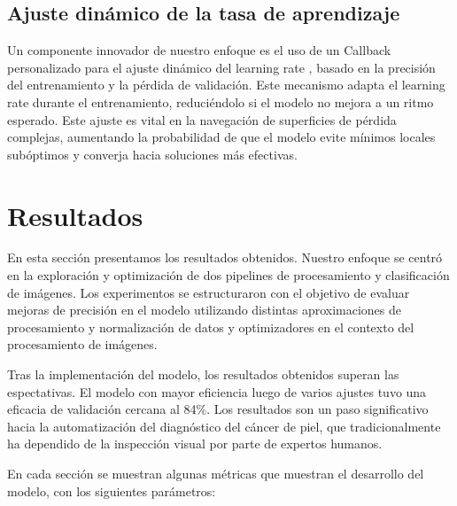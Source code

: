 \subsection{Ajuste dinámico de la tasa de aprendizaje}

Un componente innovador de nuestro enfoque es el uso de un Callback personalizado para el ajuste dinámico del learning rate , basado en la precisión del entrenamiento y la pérdida de validación. Este mecanismo adapta el learning rate durante el entrenamiento, reduciéndolo si el modelo no mejora a un ritmo esperado. Este ajuste es vital en la navegación de superficies de pérdida complejas, aumentando la probabilidad de que el modelo evite mínimos locales subóptimos y converja hacia soluciones más efectivas.

\section{Resultados}\label{sec:results}

En esta sección presentamos los resultados obtenidos. Nuestro enfoque se centró en la exploración y optimización de dos pipelines de procesamiento y clasificación de imágenes. Los experimentos se estructuraron con el objetivo de evaluar mejoras de precisión en el modelo utilizando distintas aproximaciones de procesamiento y normalización de datos y optimizadores en el contexto del procesamiento de imágenes.

Tras la implementación del modelo, los resultados obtenidos superan las espectativas. El modelo con mayor eficiencia luego de varios ajustes tuvo una eficacia de validación cercana al 84\%. Los resultados son un paso significativo hacia la automatización del diagnóstico del cáncer de piel, que tradicionalmente ha dependido de la inspección visual por parte de expertos humanos. 

En cada sección se muestran algunas métricas que muestran el desarrollo del modelo, con los siguientes parámetros:

